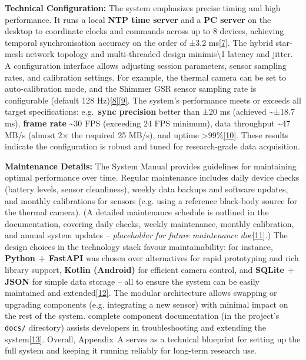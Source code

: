 \documentclass[12pt,a4paper]{article}
\begin{document}
\textbf{Technical Configuration:} The system emphasizes precise timing and high performance. It runs a local \textbf{NTP time server} and a \textbf{PC server} on the desktop to coordinate clocks and commands across up to 8 devices, achieving temporal synchronisation accuracy on the order of ±3.2 ms\href{docs/README.md\#L2-L5}{{[}7{]}}. The hybrid star-mesh network topology and multi-threaded design minimis\textbackslash1 latency and jitter. A configuration interface allows adjusting session parameters, sensor sampling rates, and calibration settings. For example, the thermal camera can be set to auto-calibration mode, and the Shimmer GSR sensor sampling rate is configurable (default 128 Hz)\href{docs/thesis_report/Chapter_7_Appendices.md\#L30-L38}{{[}8{]}}\href{docs/thesis_report/Chapter_7_Appendices.md\#L32-L40}{{[}9{]}}. The system's performance meets or exceeds all target specifications: e.g.~\textbf{sync precision} better than ±20 ms (achieved \textasciitilde±18.7 ms), \textbf{frame rate} \textasciitilde30 FPS (exceeding 24 FPS minimum), data throughput \textasciitilde47 MB/s (almost 2× the required 25 MB/s), and uptime \textgreater99\%\href{docs/thesis_report/Chapter_7_Appendices.md\#L124-L132}{{[}10{]}}. These results indicate the configuration is robust and tuned for research-grade data acquisition.

\textbf{Maintenance Details:} The System Manual provides guidelines for maintaining optimal performance over time. Regular maintenance includes daily device checks (battery levels, sensor cleanliness), weekly data backups and software updates, and monthly calibrations for sensors (e.g. using a reference black-body source for the thermal camera). (A detailed maintenance schedule is outlined in the documentation, covering daily checks, weekly maintenance, monthly calibration, and annual system updates -- \emph{placeholder for future maintenance doc}\href{docs/thesis_report/Chapter_7_Appendices.md\#L14-L22}{{[}11{]}}.) The design choices in the technology stack favour maintainability: for instance, \textbf{Python + FastAPI} was chosen over alternatives for rapid prototyping and rich library support, \textbf{Kotlin (Android)} for efficient camera control, and \textbf{SQLite + JSON} for simple data storage -- all to ensure the system can be easily maintained and extended\href{docs/thesis_report/Chapter_7_Appendices.md\#L139-L147}{{[}12{]}}. The modular architecture allows swapping or upgrading components (e.g. integrating a new sensor) with minimal impact on the rest of the system. complete component documentation (in the project's \passthrough{\lstinline!docs/!} directory) assists developers in troubleshooting and extending the system\href{docs/thesis_report/Chapter_7_Appendices.md\#L52-L59}{{[}13{]}}. Overall, Appendix~A serves as a technical blueprint for setting up the full system and keeping it running reliably for long-term research use.
\end{document}
